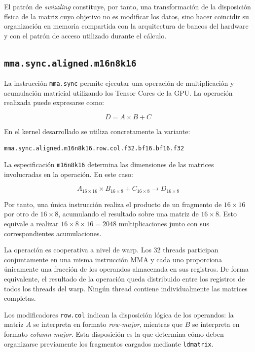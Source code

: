 El patrón de \textit{swizzling} constituye, por tanto, una transformación de la disposición física de la matriz cuyo objetivo no es modificar los datos, sino hacer coincidir su organización en memoria compartida con la arquitectura de bancos del hardware y con el patrón de acceso utilizado durante el cálculo.

\subsection{\texttt{mma.sync.aligned.m16n8k16}}

La instrucción \texttt{mma.sync} permite ejecutar una operación de multiplicación y acumulación matricial utilizando los Tensor Cores de la GPU. La operación realizada puede expresarse como:

$$
D = A \times B + C
$$

En el kernel desarrollado se utiliza concretamente la variante:

\begin{verbatim}
mma.sync.aligned.m16n8k16.row.col.f32.bf16.bf16.f32
\end{verbatim}

La especificación \texttt{m16n8k16} determina las dimensiones de las matrices involucradas en la operación. En este caso:

$$
A_{16\times16} \times B_{16\times8} + C_{16\times8}
\rightarrow D_{16\times8}
$$

Por tanto, una única instrucción realiza el producto de un fragmento de \(16\times16\) por otro de \(16\times8\), acumulando el resultado sobre una matriz de \(16\times8\). Esto equivale a realizar \(16\times8\times16=2048\) multiplicaciones junto con sus correspondientes acumulaciones.

La operación es cooperativa a nivel de warp. Los 32 threads participan conjuntamente en una misma instrucción MMA y cada uno proporciona únicamente una fracción de los operandos almacenada en sus registros. De forma equivalente, el resultado de la operación queda distribuido entre los registros de todos los threads del warp. Ningún thread contiene individualmente las matrices completas.

Los modificadores \texttt{row.col} indican la disposición lógica de los operandos: la matriz \(A\) se interpreta en formato \textit{row-major}, mientras que \(B\) se interpreta en formato \textit{column-major}. Esta disposición es la que determina cómo deben organizarse previamente los fragmentos cargados mediante \texttt{ldmatrix}.

